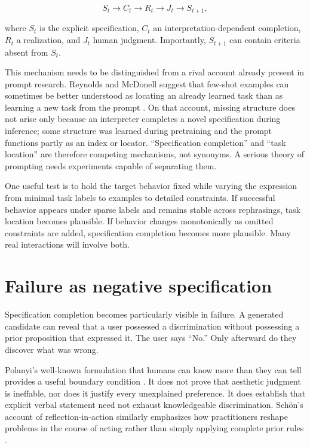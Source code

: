 \documentclass[11pt]{article}
\begin{document}
\[
S_t \rightarrow C_t \rightarrow R_t \rightarrow J_t \rightarrow S_{t+1},
\]

where $S_t$ is the explicit specification, $C_t$ an interpretation-dependent completion, $R_t$ a realization, and $J_t$ human judgment. Importantly, $S_{t+1}$ can contain criteria absent from $S_t$.

This mechanism needs to be distinguished from a rival account already present in prompt research. Reynolds and McDonell suggest that few-shot examples can sometimes be better understood as locating an already learned task than as learning a new task from the prompt \parencite{reynolds2021promptprogramming}. On that account, missing structure does not arise only because an interpreter completes a novel specification during inference; some structure was learned during pretraining and the prompt functions partly as an index or locator. ``Specification completion'' and ``task location'' are therefore competing mechanisms, not synonyms. A serious theory of prompting needs experiments capable of separating them.

One useful test is to hold the target behavior fixed while varying the expression from minimal task labels to examples to detailed constraints. If successful behavior appears under sparse labels and remains stable across rephrasings, task location becomes plausible. If behavior changes monotonically as omitted constraints are added, specification completion becomes more plausible. Many real interactions will involve both.

\section{Failure as negative specification}

Specification completion becomes particularly visible in failure. A generated candidate can reveal that a user possessed a discrimination without possessing a prior proposition that expressed it. The user says ``No.'' Only afterward do they discover what was wrong.

Polanyi's well-known formulation that humans can know more than they can tell provides a useful boundary condition \parencite{polanyi1966tacit}. It does not prove that aesthetic judgment is ineffable, nor does it justify every unexplained preference. It does establish that explicit verbal statement need not exhaust knowledgeable discrimination. Schön's account of reflection-in-action similarly emphasizes how practitioners reshape problems in the course of acting rather than simply applying complete prior rules \parencite{schon1983reflective}.
\end{document}
